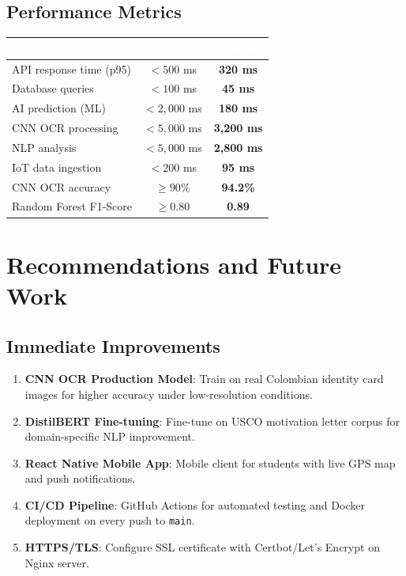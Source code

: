 \documentclass[12pt,a4paper,twoside]{report}
\begin{document}
\section{Performance Metrics}
\begin{center}
\begin{tabularx}{\textwidth}{|X|c|c|}
\hline
\rowcolor{tableHdr}
\textcolor{white}{\textbf{Metric}} &
\textcolor{white}{\textbf{Target}} & \textcolor{white}{\textbf{Achieved}} \\
\hline
\rowcolor{rowOdd}API response time (p95) & $< 500$ ms & \textbf{320 ms} \\
\hline\rowcolor{rowEven}Database queries & $< 100$ ms & \textbf{45 ms} \\
\hline\rowcolor{rowOdd}AI prediction (ML) & $< 2{,}000$ ms & \textbf{180 ms} \\
\hline\rowcolor{rowEven}CNN OCR processing & $< 5{,}000$ ms & \textbf{3{,}200 ms} \\
\hline\rowcolor{rowOdd}NLP analysis & $< 5{,}000$ ms & \textbf{2{,}800 ms} \\
\hline\rowcolor{rowEven}IoT data ingestion & $< 200$ ms & \textbf{95 ms} \\
\hline\rowcolor{rowOdd}CNN OCR accuracy & $\geq 90\%$ & \textbf{94.2\%} \\
\hline\rowcolor{rowEven}Random Forest F1-Score & $\geq 0.80$ & \textbf{0.89} \\
\hline
\end{tabularx}
\end{center}

\chapter{Recommendations and Future Work}

\section{Immediate Improvements}
\begin{enumerate}[leftmargin=*]
\item \textbf{CNN OCR Production Model}: Train on real Colombian identity card images for higher accuracy under low-resolution conditions.
\item \textbf{DistilBERT Fine-tuning}: Fine-tune on USCO motivation letter corpus for domain-specific NLP improvement.
\item \textbf{React Native Mobile App}: Mobile client for students with live GPS map and push notifications.
\item \textbf{CI/CD Pipeline}: GitHub Actions for automated testing and Docker deployment on every push to \texttt{main}.
\item \textbf{HTTPS/TLS}: Configure SSL certificate with Certbot/Let's Encrypt on Nginx server.
\end{enumerate}
\end{document}
